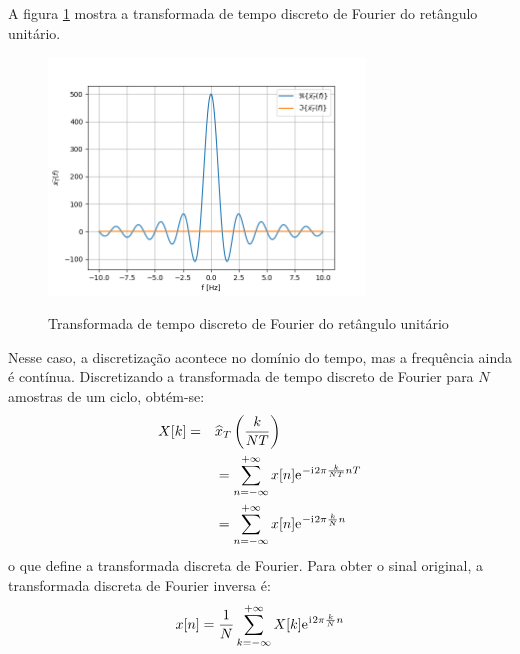 \documentclass[12pt,a4paper]{report}
\newcommand{\I}{{\mathrm{i}\mkern1mu}}
\newcommand{\euler}{{\mathrm{e}\mkern1mu}}
\begin{document}
  A figura \ref{fig:discrete_time_fourier_transform} mostra a transformada de tempo discreto de Fourier do
  retângulo unitário.
  \begin{figure}[H]
    \caption{Transformada de tempo discreto de Fourier do retângulo unitário}
    \centering
    \includegraphics[width=0.75\textwidth]{discrete_time_fourier_transform}
    \label{fig:discrete_time_fourier_transform}
  \end{figure}
  Nesse caso, a discretização acontece no domínio do tempo, mas a frequência ainda é contínua. Discretizando a
  transformada de tempo discreto de Fourier para $N$ amostras de um ciclo, obtém-se:
  \begin{equation}
    \begin{split}
      X[k] = &\quad \widehat{x}_T\left(\frac{k}{N T}\right)
      \\ &\quad = \sum_{n = -\infty}^{+\infty} x[n] \euler^{-\I 2 \pi \frac{k}{N T} n T}
      \\ &\quad = \sum_{n = -\infty}^{+\infty} x[n] \euler^{-\I 2 \pi \frac{k}{N} n}
    \end{split}
  \end{equation}
  o que define a transformada discreta de Fourier. Para obter o sinal original, a transformada discreta de
  Fourier inversa é:
  \begin{equation}
    x[n] = \frac{1}{N} \sum_{k = -\infty}^{+\infty} X[k] \euler^{\I 2 \pi \frac{k}{N} n}
  \end{equation}
  
\end{document}

